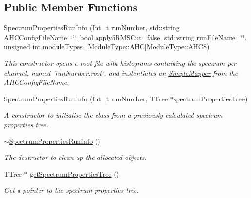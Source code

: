 \subsection*{Public Member Functions}
\begin{DoxyCompactItemize}
\item 
\hyperlink{class_spectrum_properties_run_info_a21d9494b3f2b982c546c240375fdc89b}{SpectrumPropertiesRunInfo} (Int\_\-t runNumber, std::string AHCConfigFileName=\char`\"{}\char`\"{}, bool apply5RMSCut=false, std::string runFileName=\char`\"{}\char`\"{}, unsigned int moduleTypes=\hyperlink{class_module_type_aab41c936717bfb248a8bf1f38138db0b}{ModuleType::AHC}$|$\hyperlink{class_module_type_a9cbd6a48fabe66ed9d47d23e53d8c9b9}{ModuleType::AHC8})
\begin{DoxyCompactList}\small\item\em This constructor opens a root file with histograms containing the spectrum per channel, named 'runNumber.root', and instantiates an \hyperlink{class_simple_mapper}{SimpleMapper} from the AHCConfigFileName. \item\end{DoxyCompactList}\item 
\hyperlink{class_spectrum_properties_run_info_a282a3cf9cc345986c7e9852b8e8a23ec}{SpectrumPropertiesRunInfo} (Int\_\-t runNumber, TTree $\ast$spectrumPropertiesTree)
\begin{DoxyCompactList}\small\item\em A constructor to initialise the class from a previously calculated spectrum properties tree. \item\end{DoxyCompactList}\item 
\hyperlink{class_spectrum_properties_run_info_a34cac3093acb09c6603bbbe941a1e496}{$\sim$SpectrumPropertiesRunInfo} ()
\begin{DoxyCompactList}\small\item\em The destructor to clean up the allocated objects. \item\end{DoxyCompactList}\item 
TTree $\ast$ \hyperlink{class_spectrum_properties_run_info_aca0dfbac309a9619d04ce536855a89a2}{getSpectrumPropertiesTree} ()
\begin{DoxyCompactList}\small\item\em Get a pointer to the spectrum properties tree. \item\end{DoxyCompactList}\item 

\end{DoxyCompactItemize}
